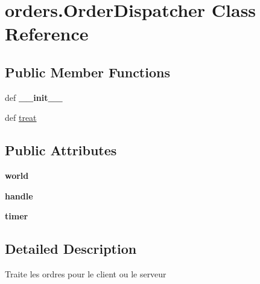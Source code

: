 \hypertarget{classorders_1_1_order_dispatcher}{\section{orders.\-Order\-Dispatcher \-Class \-Reference}
\label{classorders_1_1_order_dispatcher}
}
\subsection*{\-Public \-Member \-Functions}
\begin{DoxyCompactItemize}
\item 
\hypertarget{classorders_1_1_order_dispatcher_ae49ccd75a98bf4d03734acabc60a8191}{def {\bfseries \-\_\-\-\_\-init\-\_\-\-\_\-}}\label{classorders_1_1_order_dispatcher_ae49ccd75a98bf4d03734acabc60a8191}

\item 
def \hyperlink{classorders_1_1_order_dispatcher_ad7ce3b5e93f23334280236d7b3f65c01}{treat}
\end{DoxyCompactItemize}
\subsection*{\-Public \-Attributes}
\begin{DoxyCompactItemize}
\item 
\hypertarget{classorders_1_1_order_dispatcher_a3e8a2d43b1b5849af6d2556d6bca5b18}{{\bfseries world}}\label{classorders_1_1_order_dispatcher_a3e8a2d43b1b5849af6d2556d6bca5b18}

\item 
\hypertarget{classorders_1_1_order_dispatcher_a46638f289946e25105aa54056c792324}{{\bfseries handle}}\label{classorders_1_1_order_dispatcher_a46638f289946e25105aa54056c792324}

\item 
\hypertarget{classorders_1_1_order_dispatcher_a753b3b377c0103eb3130eca0e792e75d}{{\bfseries timer}}\label{classorders_1_1_order_dispatcher_a753b3b377c0103eb3130eca0e792e75d}

\end{DoxyCompactItemize}


\subsection{\-Detailed \-Description}
\begin{DoxyVerb}Traite les ordres pour le client ou le serveur \end{DoxyVerb}
 

